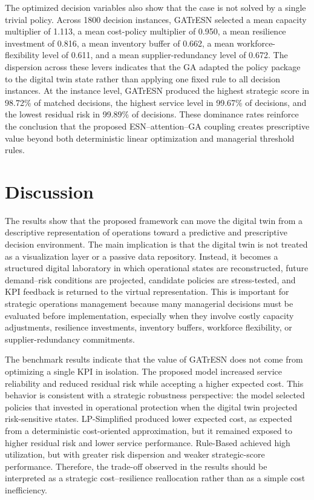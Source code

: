 \documentclass[apajournal,article,submit,pdftex,moreauthors]{Definitions/mdpi}
\begin{document}
The optimized decision variables also show that the case is not solved by a single trivial policy. Across 1800 decision instances, GATrESN selected a mean capacity multiplier of 1.113, a mean cost-policy multiplier of 0.950, a mean resilience investment of 0.816, a mean inventory buffer of 0.662, a mean workforce-flexibility level of 0.611, and a mean supplier-redundancy level of 0.672. The dispersion across these levers indicates that the GA adapted the policy package to the digital twin state rather than applying one fixed rule to all decision instances. At the instance level, GATrESN produced the highest strategic score in 98.72\% of matched decisions, the highest service level in 99.67\% of decisions, and the lowest residual risk in 99.89\% of decisions. These dominance rates reinforce the conclusion that the proposed ESN--attention--GA coupling creates prescriptive value beyond both deterministic linear optimization and managerial threshold rules.

\section{Discussion}
The results show that the proposed framework can move the digital twin from a descriptive representation of operations toward a predictive and prescriptive decision environment. The main implication is that the digital twin is not treated as a visualization layer or a passive data repository. Instead, it becomes a structured digital laboratory in which operational states are reconstructed, future demand--risk conditions are projected, candidate policies are stress-tested, and KPI feedback is returned to the virtual representation. This is important for strategic operations management because many managerial decisions must be evaluated before implementation, especially when they involve costly capacity adjustments, resilience investments, inventory buffers, workforce flexibility, or supplier-redundancy commitments.

The benchmark results indicate that the value of GATrESN does not come from optimizing a single KPI in isolation. The proposed model increased service reliability and reduced residual risk while accepting a higher expected cost. This behavior is consistent with a strategic robustness perspective: the model selected policies that invested in operational protection when the digital twin projected risk-sensitive states. LP-Simplified produced lower expected cost, as expected from a deterministic cost-oriented approximation, but it remained exposed to higher residual risk and lower service performance. Rule-Based achieved high utilization, but with greater risk dispersion and weaker strategic-score performance. Therefore, the trade-off observed in the results should be interpreted as a strategic cost--resilience reallocation rather than as a simple cost inefficiency.
\end{document}
